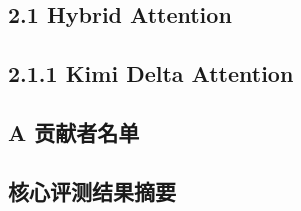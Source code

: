 \subsection{2.1 Hybrid Attention}\label{hybrid-attention}

\subsection{2.1.1 Kimi Delta Attention}\label{kimi-delta-attention}

\subsection{A 贡献者名单}\label{a-contributions}

\subsection{核心评测结果摘要}
